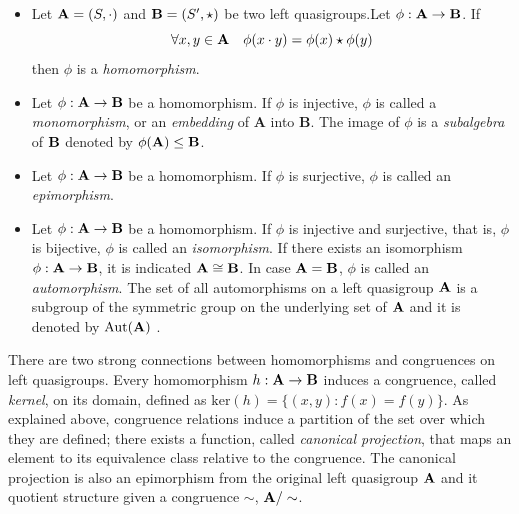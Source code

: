 \documentclass{mcom-l}
\begin{document}
\begin{definition} \cite{burris1981course}\label{automorphism}
\begin{itemize}


    \item Let $\mathbf{A} = (S, \cdot)$ and $\mathbf{B}=(S',\star)$ be two left quasigroups.\newline Let $\phi : \mathbf{A} \to \mathbf{B}$.\newline
If 
\[\forall x,y \in \mathbf{A} \quad \phi(x\cdot y)= \phi(x)\star \phi(y)\]
then $\phi$ is a \emph{homomorphism}.

    \item Let $\phi : \mathbf{A} \to \mathbf{B}$ be a homomorphism. If $\phi$ is injective, $\phi$ is called a \emph{monomorphism}, or an \emph{embedding} of \textbf{A} into \textbf{B}.  The image of $\phi$ is a \emph{subalgebra} of $\mathbf{B}$ denoted by $\phi(\mathbf{A}) \leq \mathbf{B}$. 
    

     \item Let $\phi : \mathbf{A} \to \mathbf{B}$ be a homomorphism. If $\phi$ is surjective, $\phi$ is called an \emph{epimorphism}. 
     
     \item Let $\phi : \mathbf{A} \to \mathbf{B}$ be a homomorphism. If $\phi$ is injective and surjective, that is, $\phi$ is bijective, $\phi$ is called an \emph{isomorphism}. \newline If there exists an isomorphism $\phi: \mathbf{A} \to \mathbf{B}$, it is indicated $\mathbf{A} \cong \mathbf{B}$.\newline
In case $\mathbf{A}=\mathbf{B}$, $\phi$ is called an \emph{automorphism}. \newline The set of all automorphisms on a left quasigroup $\mathbf{A}$ is a subgroup of the symmetric group on the underlying set of $\mathbf{A}$ and it is denoted by $\operatorname{Aut}(\mathbf{A})$ \cite{warner1990modern}.
\end{itemize}
\end{definition}
\noindent There are two strong connections between homomorphisms and congruences on left quasigroups. Every homomorphism $h : \mathbf{A} \to \mathbf{B}$ induces a congruence, called \emph{kernel}, on its domain, defined as $\text{ker}(h) = \{(x,y) : f(x) = f(y) \}$. As explained above, congruence relations induce a partition of the set over which they are defined; there exists a function, called \emph{canonical projection}, that maps an element to its equivalence class relative to the congruence. The canonical projection is also an epimorphism from the original left quasigroup $\mathbf{A}$ and it quotient structure given a congruence $\sim$, $\mathbf{A}/\sim$.\newline\newline
\end{document}
